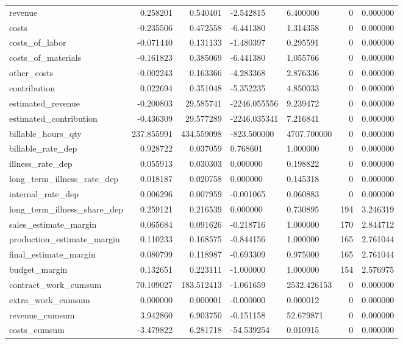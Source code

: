 \begin{landscape}
\begin{longtable}[h!]{lrrllrr}
revenue & 0.258201 & 0.540401 & -2.542815 & 6.400000 & 0 & 0.000000 \\
costs & -0.235506 & 0.472558 & -6.441380 & 1.314358 & 0 & 0.000000 \\
costs_of_labor & -0.071440 & 0.131133 & -1.480397 & 0.295591 & 0 & 0.000000 \\
costs_of_materials & -0.161823 & 0.385069 & -6.441380 & 1.055766 & 0 & 0.000000 \\
other_costs & -0.002243 & 0.163366 & -4.283368 & 2.876336 & 0 & 0.000000 \\
contribution & 0.022694 & 0.351048 & -5.352235 & 4.850033 & 0 & 0.000000 \\
estimated_revenue & -0.200803 & 29.585741 & -2246.055556 & 9.239472 & 0 & 0.000000 \\
estimated_contribution & -0.436309 & 29.577289 & -2246.035341 & 7.216841 & 0 & 0.000000 \\
billable_hours_qty & 237.855991 & 434.559098 & -823.500000 & 4707.700000 & 0 & 0.000000 \\
billable_rate_dep & 0.928722 & 0.037059 & 0.768601 & 1.000000 & 0 & 0.000000 \\
illness_rate_dep & 0.055913 & 0.030303 & 0.000000 & 0.198822 & 0 & 0.000000 \\
long_term_illness_rate_dep & 0.018187 & 0.020758 & 0.000000 & 0.145318 & 0 & 0.000000 \\
internal_rate_dep & 0.006296 & 0.007959 & -0.001065 & 0.060883 & 0 & 0.000000 \\
long_term_illness_share_dep & 0.259121 & 0.216539 & 0.000000 & 0.730895 & 194 & 3.246319 \\
sales_estimate_margin & 0.065684 & 0.091626 & -0.218716 & 1.000000 & 170 & 2.844712 \\
production_estimate_margin & 0.110233 & 0.168575 & -0.844156 & 1.000000 & 165 & 2.761044 \\
final_estimate_margin & 0.080799 & 0.118987 & -0.693309 & 0.975000 & 165 & 2.761044 \\
budget_margin & 0.132651 & 0.223111 & -1.000000 & 1.000000 & 154 & 2.576975 \\
contract_work_cumsum & 70.109027 & 183.512413 & -1.061659 & 2532.426153 & 0 & 0.000000 \\
extra_work_cumsum & 0.000000 & 0.000001 & -0.000000 & 0.000012 & 0 & 0.000000 \\
revenue_cumsum & 3.942860 & 6.903750 & -0.151158 & 52.679871 & 0 & 0.000000 \\
costs_cumsum & -3.479822 & 6.281718 & -54.539254 & 0.010915 & 0 & 0.000000 \\

\end{longtable}
\end{landscape}
